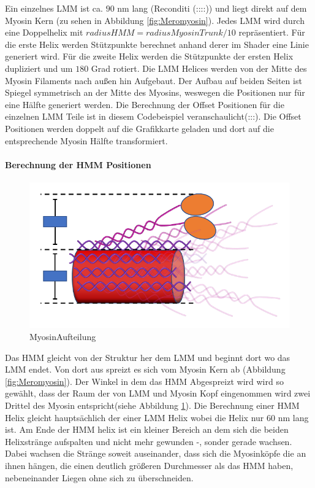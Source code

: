 \documentclass[a4paper,m]{cgBA}
\begin{document}
Ein einzelnes LMM ist ca. \(90\) nm lang (Reconditi (::::)) und liegt direkt auf dem Myosin Kern (zu sehen in Abbildung \ref{fig:Meromyosin}). 
Jedes LMM wird durch eine Doppelhelix mit \(radiusHMM = radiusMyosinTrunk / 10\) repräsentiert. Für die erste Helix werden Stützpunkte berechnet anhand derer im Shader eine Linie generiert wird. Für die zweite Helix werden die Stützpunkte der ersten Helix dupliziert und um \(180\) Grad rotiert.
Die LMM Helices werden von der Mitte des Myosin Filaments nach außen hin Aufgebaut. Der Aufbau auf beiden Seiten ist Spiegel symmetrisch an der Mitte des Myosins, weswegen die Positionen nur für eine Hälfte generiert werden. Die Berechnung der Offset Positionen für die einzelnen LMM Teile ist in diesem Codebeispiel veranschaulicht(:::). Die Offset Positionen werden doppelt auf die Grafikkarte geladen und dort auf die entsprechende Myosin Hälfte transformiert.

\paragraph{Berechnung der HMM Positionen}

\begin{figure}[!h]
\center
\includegraphics[width=1\textwidth]{Graphics/MyosinAufteilung.pdf}
\caption{MyosinAufteilung}
\label{fig:MyosinAufteilung}
\end{figure}

Das HMM gleicht von der Struktur her dem LMM und beginnt dort wo das LMM endet. Von dort aus spreizt es sich vom Myosin Kern ab (Abbildung \ref{fig:Meromyosin}). Der Winkel in dem das HMM Abgespreizt wird wird so gewählt, dass der Raum der von LMM und Myosin Kopf eingenommen wird zwei Drittel des Myosin entspricht(siehe Abbildung \ref{fig:MyosinAufteilung}).
Die Berechnung einer HMM Helix gleicht hauptsächlich der einer LMM Helix wobei die Helix nur \(60\) nm lang ist.
Am Ende der HMM helix ist ein kleiner Bereich an dem sich die beiden Helixstränge aufspalten und nicht mehr gewunden -, sonder gerade wachsen. Dabei wachsen die Stränge soweit auseinander, dass sich die Myosinköpfe die an ihnen hängen, die einen deutlich größeren Durchmesser als das HMM haben, nebeneinander Liegen ohne sich zu überschneiden.
\end{document}

